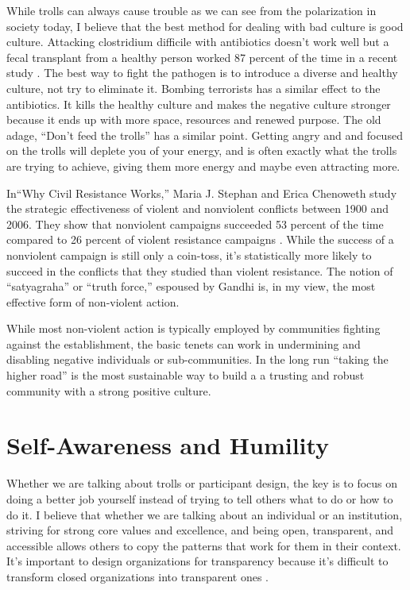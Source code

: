 While trolls can always cause trouble as we can see from the polarization in society today, I believe that the best method for dealing with bad culture is good culture. Attacking clostridium difficile with antibiotics doesn't work well but a fecal transplant from a healthy person worked 87 percent of the time in a recent study \cite{jiang2017randomised}. The best way to fight the pathogen is to introduce a diverse and healthy culture, not try to eliminate it. Bombing terrorists has a similar effect to the antibiotics. It kills the healthy culture and makes the negative culture stronger because it ends up with more space, resources and renewed purpose. The old adage, ``Don't feed the trolls'' has a similar point. Getting angry and and focused on the trolls will deplete you of your energy, and is often exactly what the trolls are trying to achieve, giving them more energy and maybe even attracting more.

In``Why Civil Resistance Works,'' Maria J. Stephan and Erica Chenoweth study the strategic effectiveness of violent and nonviolent conflicts between 1900 and 2006. They show that nonviolent campaigns succeeded 53 percent of the time compared to 26 percent of violent resistance campaigns \cite{chenoweth2011civil}. While the success of a nonviolent campaign is still only a coin-toss, it's statistically more likely to succeed in the conflicts that they studied than violent resistance. The notion of ``satyagraha'' or ``truth force,'' espoused by Gandhi \cite{majmudar2012gandhi} is, in my view, the most effective form of non-violent action.

While most non-violent action is typically employed by communities fighting against the establishment, the basic tenets can work in undermining and disabling negative individuals or sub-communities. In the long run ``taking the higher road'' is the most sustainable way to build a a trusting and robust community with a strong positive culture.

\section{Self-Awareness and Humility} 

Whether we are talking about trolls or participant design, the key is to focus on doing a better job yourself instead of trying to tell others what to do or how to do it. I believe that whether we are talking about an individual or an institution, striving for strong core values and excellence, and being open, transparent, and accessible allows others to copy the patterns that work for them in their context. It's important to design organizations for transparency because it's difficult to transform closed organizations into transparent ones \cite{Ito2011Designings}.

